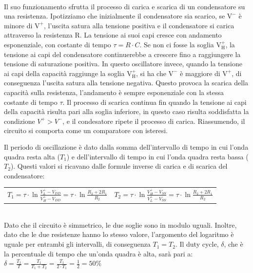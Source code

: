 \documentclass{report}
\begin{document}
\\Il suo funzionamento sfrutta il processo di carica e scarica di un condensatore su una resistenza. Ipotizziamo che inizialmente il condensatore sia scarico, se $\mathrm{V^-}$ è minore di $\mathrm{V^+}$, l'uscita satura alla tensione positiva e il condensatore si carica attraverso la resistenza $\mathrm{R}$. La tensione ai suoi capi cresce con andamento esponenziale, con costante di tempo $\displaystyle{\tau=R\cdot C}$. Se non ci fosse la soglia $\mathrm{V_H^+}$, la tensione ai capi del condensatore continuerebbe a crescere fino a raggiungere la tensione di saturazione positiva. In questo oscillatore invece, quando la tensione ai capi della capacità raggiunge la soglia $\mathrm{V_H^+}$, si ha che $\mathrm{V^-}$ è maggiore di $\mathrm{V^+}$, di conseguenza l'uscita satura alla tensione negativa. Questo provoca la scarica della capacità sulla resistenza, l'andamento è sempre esponenziale con la stessa costante di tempo $\tau$. Il processo di scarica continua fin quando la tensione ai capi della capacità risulta pari alla soglia inferiore, in questo caso risulta soddisfatta la condizione $V^+>V^-$, e il condesatore ripete il processo di carica. Riassumendo, il circuito si comporta come un comparatore con isteresi.\par
Il periodo di oscillazione è dato dalla somma dell'intervallo di tempo in cui l'onda quadra resta alta ($T_1$) e dell'intervallo di tempo in cui l'onda quadra resta bassa ($T_2$). Questi valori si ricavano dalle formule inverse di carica e di scarica del condensatore:
\begin{table}[h!]
	\centering
	\begin{tabular}{cc}
		$\displaystyle{T_1=\tau\cdot\ln\frac{V_L^+-V_{DD}}{V_H^+-V_{DD}}=\tau\cdot\ln\frac{R_2+2R_1}{R_2}}$\;\;\;\;\;\;\;\;\;\;\;\;\; & $\displaystyle{T_2=\tau\cdot\ln\frac{V_H^+-V_{SS}}{V_L^+-V_{SS}}=\tau\cdot\ln\frac{R_2+2R_1}{R_2}}$\\ 
	\end{tabular}
	\label{table:formuleSoglie}
\end{table}
\\Dato che il circuito è simmetrico, le due soglie sono in modulo uguali. Inoltre, dato che le due resistenze hanno lo stesso valore, l'argomento del logaritmo è uguale per entrambi gli intervalli, di conseguenza $T_1=T_2$. Il duty cycle, $\delta$, che è la percentuale di tempo che un'onda quadra è alta, sarà pari a:
\\[4pt]\indent$\displaystyle{\delta=\frac{T_1}{T}=\frac{T_1}{T_1+T_2}=\frac{T_1}{2\cdot T_1}=\frac{1}{2}=50\%}$
\end{document}
